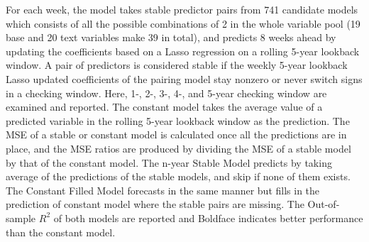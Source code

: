 \documentclass[11pt]{article}
\begin{document}
For each week, the model takes stable predictor pairs from 741 candidate models which consists of all the possible combinations of 2 in the whole variable pool (19 base and 20 text variables make 39 in total), and predicts 8 weeks ahead by updating the coefficients based on a Lasso regression on a rolling 5-year lookback window. A pair of predictors is considered stable if the weekly 5-year lookback Lasso updated coefficients of the pairing model stay nonzero or never switch signs in a checking window. Here, 1-, 2-, 3-, 4-, and 5-year checking window are examined and reported. The constant model takes the average value of a predicted variable in the rolling 5-year lookback window as the prediction. The MSE of a stable or constant model is calculated once all the predictions are in place, and the MSE ratios are produced by dividing the MSE of a stable model by that of the constant model. The n-year Stable Model predicts by taking average of the predictions of the stable models, and skip if none of them exists. The Constant Filled Model forecasts in the same manner but fills in the prediction of constant model where the stable pairs are missing. The Out-of-sample $R^2$ of both models are reported and Boldface indicates better performance than the constant model. \\
\end{document}
